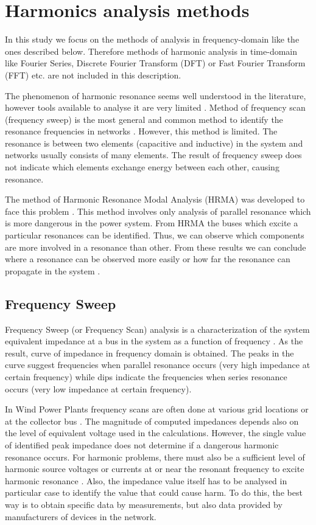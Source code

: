 \documentclass[12pt]{report} %
\begin{document}
\chapter{Harmonics analysis methods} \label{sec:methodsofanalysis}
In this study we focus on the methods of analysis in frequency-domain like the ones described below. Therefore methods of harmonic analysis in time-domain like Fourier Series, Discrete Fourier Transform (DFT) or Fast Fourier Transform (FFT) etc. are not included in this description.

The phenomenon of harmonic resonance seems well understood in the literature, however tools available to analyse it are very limited \cite{xu2005}. Method of frequency scan (frequency sweep) is the most general and common method to identify the resonance frequencies in networks \cite{modal1982}. However, this method is limited. The resonance is between two elements (capacitive and inductive) in the system and networks usually consists of many elements. The result of frequency sweep does not indicate which elements exchange energy between each other, causing resonance.

The method of Harmonic Resonance Modal Analysis (HRMA) was developed to face this problem \cite{xu2005}. This method involves only analysis of parallel resonance which is more dangerous in the power system. From HRMA the buses which excite a particular resonances can be identified. Thus, we can observe which components are more involved in a resonance than other. From these results we can conclude where a resonance can be observed more easily or how far the resonance can propagate in the system \cite{xu2005}.

\section{Frequency Sweep} \label{sec:theoryfs}
Frequency Sweep (or Frequency Scan) analysis is a characterization of the system equivalent impedance at a bus in the system as a function of frequency \cite{bradt2012}. As the result, curve of impedance in frequency domain is obtained. The peaks in the curve suggest frequencies when parallel resonance occurs (very high impedance at certain frequency) while dips indicate the frequencies when series resonance occurs (very low impedance at certain frequency). 

In Wind Power Plants frequency scans are often done at various grid locations or at the collector bus \cite{bradt2012}. The magnitude of computed impedances depends also on the level of equivalent voltage used in the calculations. However, the single value of identified peak impedance does not determine if a dangerous harmonic resonance occurs. For harmonic problems, there must also be a sufficient level of harmonic source voltages or currents at or near the resonant frequency to excite harmonic resonance \cite{bradt2012}. Also, the impedance value itself has to be analysed in particular case to identify the value that could cause harm. To do this, the best way is to obtain specific data by measurements, but also data provided by manufacturers of devices in the network.
\end{document}
